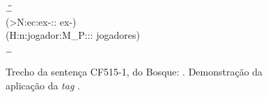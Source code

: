 \begin{figure}[!ht]
    \begin{center}
        \begin{minipage}{10cm}
            \begin{tabbing}
                \=\ldots\=\+\\
                \>(>N:ec:ex-:: ex-)\\
                \>(H:n:jogador:M\_P::: jogadores)\-\\
                \>\ldots
            \end{tabbing}
        \end{minipage}
    \end{center}
    \caption[Demonstração do uso de  no Bosque]{Trecho da sentença CF515-1, do Bosque: . Demonstração da aplicação da \textit{tag} .}
    \label{fig:bosque_2166}
\end{figure}